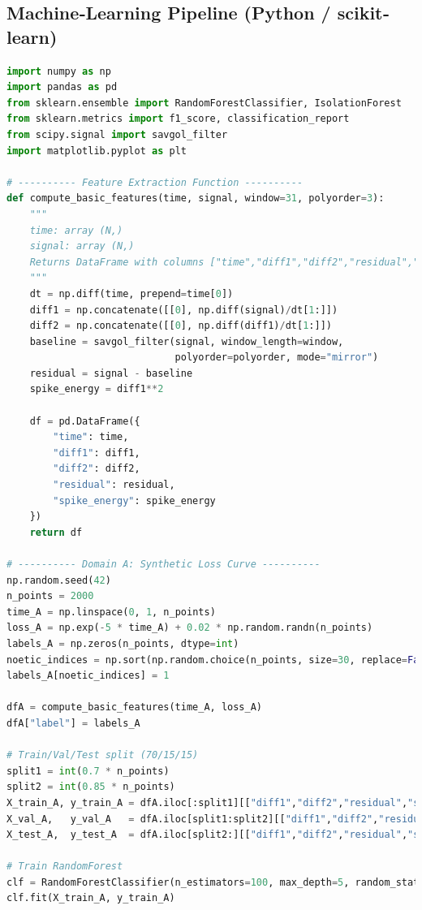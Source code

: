 \documentclass[11pt]{article}
\begin{document}
\subsection{Machine‐Learning Pipeline (Python / scikit‐learn)}\label{app:ml}
\begin{lstlisting}[language=Python,caption={ml\_pipeline.py — Noëtic Classifier \& Null Tests},label={code:ml_pipeline}]
import numpy as np
import pandas as pd
from sklearn.ensemble import RandomForestClassifier, IsolationForest
from sklearn.metrics import f1_score, classification_report
from scipy.signal import savgol_filter
import matplotlib.pyplot as plt

# ---------- Feature Extraction Function ----------
def compute_basic_features(time, signal, window=31, polyorder=3):
    """
    time: array (N,)
    signal: array (N,)
    Returns DataFrame with columns ["time","diff1","diff2","residual","spike_energy"].
    """
    dt = np.diff(time, prepend=time[0])
    diff1 = np.concatenate([[0], np.diff(signal)/dt[1:]])
    diff2 = np.concatenate([[0], np.diff(diff1)/dt[1:]])
    baseline = savgol_filter(signal, window_length=window,
                             polyorder=polyorder, mode="mirror")
    residual = signal - baseline
    spike_energy = diff1**2

    df = pd.DataFrame({
        "time": time,
        "diff1": diff1,
        "diff2": diff2,
        "residual": residual,
        "spike_energy": spike_energy
    })
    return df

# ---------- Domain A: Synthetic Loss Curve ----------
np.random.seed(42)
n_points = 2000
time_A = np.linspace(0, 1, n_points)
loss_A = np.exp(-5 * time_A) + 0.02 * np.random.randn(n_points)
labels_A = np.zeros(n_points, dtype=int)
noetic_indices = np.sort(np.random.choice(n_points, size=30, replace=False))
labels_A[noetic_indices] = 1

dfA = compute_basic_features(time_A, loss_A)
dfA["label"] = labels_A

# Train/Val/Test split (70/15/15)
split1 = int(0.7 * n_points)
split2 = int(0.85 * n_points)
X_train_A, y_train_A = dfA.iloc[:split1][["diff1","diff2","residual","spike_energy"]], dfA.iloc[:split1]["label"]
X_val_A,   y_val_A   = dfA.iloc[split1:split2][["diff1","diff2","residual","spike_energy"]], dfA.iloc[split1:split2]["label"]
X_test_A,  y_test_A  = dfA.iloc[split2:][["diff1","diff2","residual","spike_energy"]], dfA.iloc[split2:]["label"]

# Train RandomForest
clf = RandomForestClassifier(n_estimators=100, max_depth=5, random_state=0)
clf.fit(X_train_A, y_train_A)


\end{lstlisting}
\end{document}

